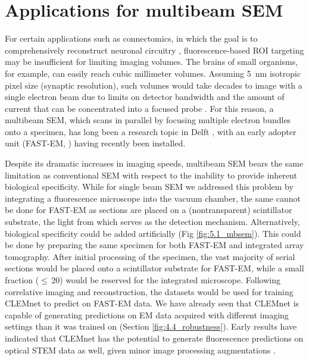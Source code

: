 \section{Applications for multibeam SEM}
\label{sec:5.2_mbsem}

For certain applications such as connectomics, in which the goal is to comprehensively reconstruct neuronal circuitry \cite{briggman2012volume}, fluorescence-based ROI targeting may be insufficient for limiting imaging volumes. The brains of small organisms, for example, can easily reach cubic millimeter volumes. Assuming \SI{5}{\nano\meter} isotropic pixel size (synaptic resolution), such volumes would take decades to image with a single electron beam due to limits on detector bandwidth and the amount of current that can be concentrated into a focused probe \cite{eberle2015high, kornfeld2018progress}. For this reason, a multibeam SEM, which scans in parallel by focusing multiple electron bundles onto a specimen, has long been a research topic in Delft \cite{zhang2008electron, mohammadi2013beams, ren2017imaging}, with an early adopter unit (FAST-EM, \cite{fermie2021high}) having recently been installed.

Despite its dramatic increases in imaging speeds, multibeam SEM bears the same limitation as conventional SEM with respect to the inability to provide inherent biological specificity. While for single beam SEM we addressed this problem by integrating a fluorescence microscope into the vacuum chamber, the same cannot be done for FAST-EM as sections are placed on a (nontransparent) scintillator substrate, the light from which serves as the detection mechanism. Alternatively, biological specificity could be added artificially (Fig \ref{fig:5.1_mbsem}). This could be done by preparing the same specimen for both FAST-EM and integrated array tomography. After initial processing of the specimen, the vast majority of serial sections would be placed onto a scintillator substrate for FAST-EM, while a small fraction ($\le$\,20) would be reserved for the integrated microscope. Following correlative imaging and reconstruction, the datasets would be used for training CLEMnet to predict on FAST-EM data. We have already seen that CLEMnet is capable of generating predictions on EM data acquired with different imaging settings than it was trained on (Section \ref{fig:4.4_robustness}). Early results have indicated that CLEMnet has the potential to generate fluorescence predictions on optical STEM data as well, given minor image processing augmentations \cite{abels2022}.

